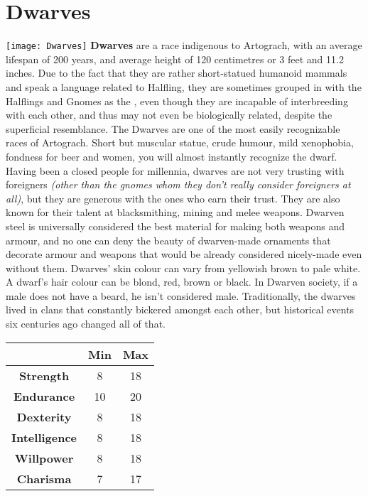 \documentclass[openany,10pt,a4paper]{book}
\begin{document}
\section{Dwarves}
\texttt{[image: Dwarves]}\newline
\textbf{Dwarves} are a race indigenous to Artograch, with an average lifespan of 200 years, and average height of 120 centimetres or 3 feet and 11.2 inches. Due to the fact that they are rather short-statued humanoid mammals and speak a language related to Halfling, they are sometimes grouped in with the Halflings and Gnomes as the , even though they are incapable of interbreeding with each other, and thus may not even be biologically related, despite the superficial resemblance.\newline
The Dwarves are one of the most easily recognizable races of Artograch. Short but muscular statue, crude humour, mild xenophobia, fondness for beer and women, you will almost instantly recognize the dwarf. Having been a closed people for millennia, dwarves are not very trusting with foreigners \textit{(other than the gnomes whom they don’t really consider foreigners at all)}, but they are generous with the ones who earn their trust. They are also known for their talent at blacksmithing, mining and melee weapons. Dwarven steel is universally considered the best material for making both weapons and armour, and no one can deny the beauty of dwarven-made ornaments that decorate armour and weapons that would be already considered nicely-made even without them. Dwarves’ skin colour can vary from yellowish brown to pale white. A dwarf's hair colour can be blond, red, brown or black. In Dwarven society, if a male does not have a beard, he isn't considered male. Traditionally, the dwarves lived in clans that constantly bickered amongst each other, but historical events six centuries ago changed all of that.\newline
\begin{tabular}{|c|c|c|}
\hline
 & \textbf{Min} & \textbf{Max} \\ \hline
\textbf{Strength} & 8 & 18 \\ \hline
\textbf{Endurance} & 10 & 20 \\ \hline
\textbf{Dexterity} & 8 & 18 \\ \hline
\textbf{Intelligence} & 8 & 18 \\ \hline
\textbf{Willpower} & 8 & 18 \\ \hline
\textbf{Charisma} & 7 & 17 \\ \hline
\end{tabular}\newline
{} \newpage
\end{document}
